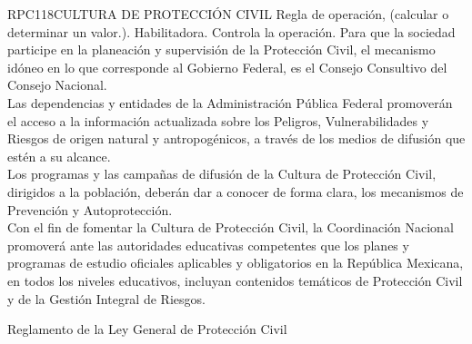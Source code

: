 \begin{BusinessRule}{RPC118}{CULTURA DE PROTECCIÓN CIVIL}{
		Regla de operación, (calcular o determinar un valor.).
	}{
		Habilitadora. 
	}{
		Controla la operación. %
	}
	\BRItem[Descripción:] Para que la sociedad participe en la planeación y supervisión de la Protección Civil, el mecanismo idóneo en lo que corresponde al Gobierno Federal, es el Consejo Consultivo del Consejo Nacional.\\Las dependencias y entidades de la Administración Pública Federal promoverán el acceso a la información actualizada sobre los Peligros, Vulnerabilidades y Riesgos de origen natural y antropogénicos, a través de los medios de difusión que estén a su alcance.\\Los programas y las campañas de difusión de la Cultura de Protección Civil, dirigidos a la población, deberán dar a conocer de forma clara, los mecanismos de Prevención y Autoprotección.\\Con el fin de fomentar la Cultura de Protección Civil, la Coordinación Nacional promoverá ante las autoridades educativas competentes que los planes y programas de estudio oficiales aplicables y obligatorios en la República Mexicana, en todos los niveles educativos, incluyan contenidos temáticos de Protección Civil y de la Gestión Integral de Riesgos.
	
	
	 Reglamento de la Ley General de Protección Civil
\end{BusinessRule}